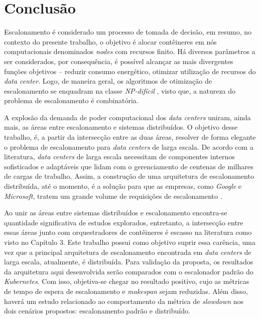 \documentclass[
	12pt,				%
	openright,			%
	oneside,			%
	a4paper,			%
	brazil				%
	]{abntex2}
\begin{document}
\chapter{Conclusão}

Escalonamento é considerado um processo de tomada de decisão, em resumo, no contexto do presente trabalho, o objetivo é alocar contêineres em nós computacionais denominados \textit{nodes} com recursos finito. Há diversos parâmetros a ser considerados, por consequência, é possível alcançar as mais divergentes funções objetivos -- reduzir consumo energético, otimizar utilização de recursos do \textit{data center}. Logo, de maneira geral, os algoritmos de otimização de escalonamento se enquadram na classe \textit{NP-difícil} \cite{ullman1975np}, visto que, a natureza do problema de escalonamento é combinatória.

A explosão da demanda de poder computacional dos \textit{data centers} uniram, ainda mais, as áreas entre escalonamento e sistemas distribuídos. O objetivo desse trabalho, é, a partir da intersecção entre as duas áreas, resolver de forma elegante o problema de escalonamento para \textit{data centers} de larga escala. De acordo com a literatura, \textit{data centers} de larga escala necessitam de componentes internos sofisticados e adaptáveis que lidam com o gerenciamento de centenas de milhares de cargas de trabalho. Assim, a construção de uma arquitetura de escalonamento distribuída, até o momento, é a solução para que as empresas, como \textit{Google} e \textit{Microsoft}, tratem um grande volume de requisições de escalonamento \cite{Wang2019Pigeon, Google2015Borg}.

Ao unir as áreas entre sistemas distribuídos e escalonamento encontra-se quantidade significativa de estudos explorados, entretanto, a intersecção entre essas áreas junto com orquestradores de contêineres é escasso na literatura como visto no Capítulo 3. Este trabalho possui como objetivo suprir essa carência, uma vez que a principal arquitetura de escalonamento encontrada em \textit{data centers} de larga escala, atualmente, é distribuída. Para validação da proposta, os resultados da arquitetura aqui desenvolvida serão comparados com o escalonador padrão do \textit{Kubernetes}. Com isso, objetiva-se chegar no resultado positivo, cujo as métricas de tempo de espera de escalonamento e \textit{makespan} sejam reduzidas. Além disso, haverá um estudo relacionado ao comportamento da métrica de \textit{slowdown} nos dois cenários propostos: escalonamento padrão e distribuído.
\end{document}
